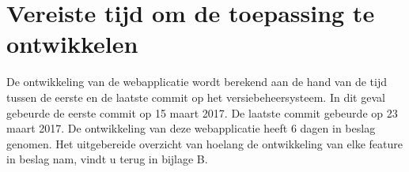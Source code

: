 \section{Vereiste tijd om de toepassing te ontwikkelen}
De ontwikkeling van de webapplicatie wordt berekend aan de hand van de tijd tussen de eerste en de laatste commit op het
versiebeheersysteem. In dit geval gebeurde de eerste commit op 15 maart 2017. De laatste commit gebeurde op 23 maart 2017.
De ontwikkeling van deze webapplicatie heeft 6 dagen in beslag genomen. Het uitgebereide overzicht van hoelang de ontwikkeling
van elke feature in beslag nam, vindt u terug in bijlage B.
